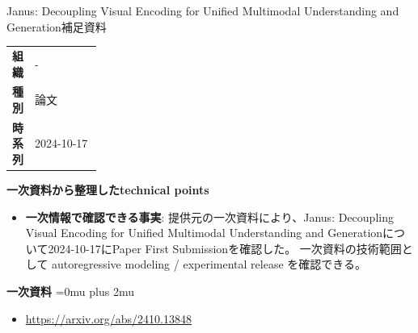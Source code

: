 \begin{technicalnote}{Janus: Decoupling Visual Encoding for Unified Multimodal Understanding and Generation}{補足資料}
\begingroup
\begin{tabularx}{\linewidth}{@{}>{\bfseries}p{0.22\linewidth}X@{}}
組織 & - \\
種別 & 論文 \\
時系列 & 2024-10-17 \\
\end{tabularx}
\smallskip
{\bfseries 一次資料から整理したtechnical points}
\begin{itemize}[leftmargin=1.5em,itemsep=0.35em]
\item \textbf{一次情報で確認できる事実}: 提供元の一次資料により、Janus: Decoupling Visual Encoding for Unified Multimodal Understanding and Generationについて2024-10-17にPaper First Submissionを確認した。 一次資料の技術範囲として autoregressive modeling / experimental release を確認できる。
\end{itemize}
\begin{minipage}{\linewidth}
\begin{samepage}
{\bfseries 一次資料}
\begingroup\sloppy
\Urlmuskip=0mu plus 2mu\relax
\begin{itemize}[leftmargin=1.5em,itemsep=0.25em]
\item {\scriptsize\url{https://arxiv.org/abs/2410.13848}}
\end{itemize}
\endgroup
\end{samepage}
\end{minipage}
\endgroup
\end{technicalnote}
\medskip

